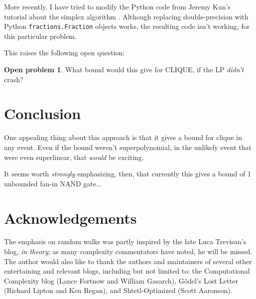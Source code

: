 \documentclass[12pt]{article}
\theoremstyle{definition}
\newtheorem{prob}{Open problem}[section]
\begin{document}
More recently, I have tried to modify the Python code from
Jeremy Kun's tutorial about the simplex algorithm \cite{kun_lp_simplex}.
Although replacing double-precision with Python {\tt fractions.Fraction}
objects works, the resulting code isn't working, for this particular
problem.

This raises the following open question:

\begin{prob}
What bound would this give for CLIQUE, if the LP {\em didn't} crash?
\end{prob}

\section{Conclusion}

One appealing thing about this approach is that it gives a
bound for clique in any event. Even if the bound weren't
superpolynomial, in the unlikely event that were even superlinear,
that {\em would} be exciting.

It seems worth {\em strongly} emphasizing, then, that currently this gives a bound
of 1 unbounded fan-in NAND gate...

\section{Acknowledgements}

The emphasis on random walks was partly inspired by the late Luca Trevisan's
blog, {\em in theory};
as many complexity commentators have noted, he will be missed.
The author would also like to thank the authors and maintainers of
several other entertaining and relevant blogs, including but
not limited to: the Computational Complexity blog
(Lance Fortnow and William Gasarch),
G\"odel's Lost Letter (Richard Lipton and Ken Regan),
and Shtetl-Optimized (Scott Aaronson).



\end{document}

